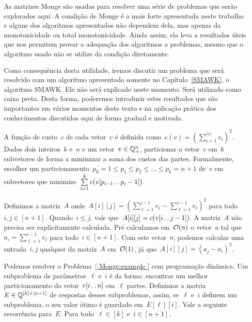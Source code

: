 As matrizes Monge são usadas para resolver uma série de problemas que serão explorados aqui. A condição de Monge é a mais forte apresentada neste trabalho e alguns dos algoritmos apresentados não dependem dela, mas apenas da monotonicidade ou total monotonicidade. Ainda assim, ela leva a resultados úteis que nos permitem provar a adequação dos algoritmos a problemas, mesmo que o algoritmo usado não se utilize da condição diretamente.  

Como consequência desta utilidade, iremos discutir um problema que será resolvido com um algoritmo apresentado somente no Capítulo~\ref{SMAWK}, o algoritmo SMAWK. Ele não será explicado neste momento. Será utilizado como caixa preta. Desta forma, poderemos introduzir estes resultados que são importantes em vários momentos deste texto e na aplicação prática dos conhecimentos discutidos aqui de forma gradual e motivada.   

\begin{prob} \label{ Monge:example }
A função de custo~$c$ de cada vetor~$v$ é definida como~$c(v) = \left( \sum\limits_{i=1}^{|v|} v_i \right)^2$. Dados dois inteiros~$k$ e~$n$ e um vetor~${ v \in \mathbb{Q}^n_+ }$, particionar o vetor~$v$ em~$k$ subvetores de forma a minimizar a soma dos custos das partes. Formalmente, escolher um particionamento~${ p_0 = 1 \leq p_1 \leq p_2 \leq \dots \leq p_k = n+1 }$ de~$v$ em subvetores que minimize~$\sum\limits_{i=1}^k c(v[p_{i-1} \,.\,.\, p_i - 1])$.
\end{prob}

Definimos a matriz~$A$ onde~${ A[i][j] = \left(\sum\limits_{\ell=1}^{j-1} v_\ell - \sum\limits_{\ell=1}^{i-1} v_\ell \right)^2 }$ para todo~${ i,j \in [n+1] }$. Quando~${ i \leq j }$, vale que~${ A[i][j] = c(v[i \,.\,.\, j-1]) }$. A matriz~$A$ não precisa ser explicitamente calculada. Pré calculamos em~$\mathcal{O}(n)$ o vetor~$a$ tal que~${ a_i = \sum_{\ell=1}^{i-1} v_\ell }$ para todo~${ i \in [n+1] }$. Com este vetor~$a$, podemos calcular uma entrada~$i,j$ qualquer da matriz~$A$ em~$\mathcal{O}(1)$, já que~${ A[i][j] = (a_j - a_i)^2 }$.

Podemos resolver o Problema~\ref{ Monge:example } com programação dinâmica. Um subproblema de parâmetros~$\ell$ e~$i$ é da forma: encontrar um melhor particionamento do vetor~${v[i \,.\,.\, n]}$ em~$\ell$ partes. Definimos a matriz~${E \in \mathbb{Q}^{[k] \times [n+1]}}$ de respostas desses subproblemas, assim, se~$\ell$ e~$i$ definem um subproblema, o seu valor ótimo é guardado em~$E[\ell][i]$. Vale a seguinte recorrência para~$E$. Para todo~$\ell \in [k]$ e~$i \in [n+1]$,

